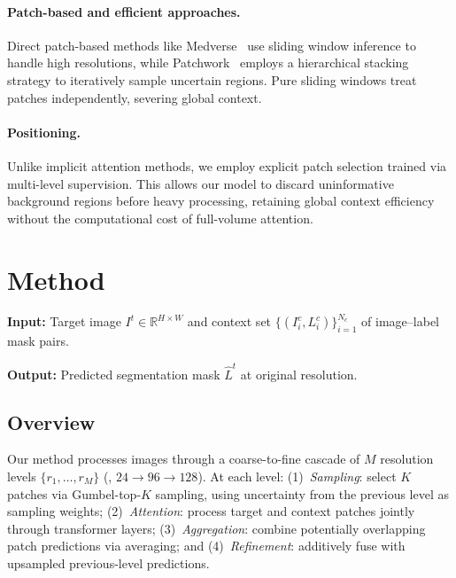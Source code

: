 \documentclass[10pt,twocolumn,letterpaper]{article}
\begin{document}
\paragraph{Patch-based and efficient approaches.}
Direct patch-based methods like Medverse~\cite{huMedverseUniversalModel2025a} use sliding window inference to handle high resolutions, while Patchwork~\cite{reisertDeepNeuralPatchworks2022a} employs a hierarchical stacking strategy to iteratively sample uncertain regions. Pure sliding windows treat patches independently, severing global context.

\paragraph{Positioning.}
Unlike implicit attention methods, we employ explicit patch selection trained via multi-level supervision. This allows our model to discard uninformative background regions before heavy processing, retaining global context efficiency without the computational cost of full-volume attention.

\section{Method}
\label{sec:method}

\noindent \textbf{Input:} Target image $I^t \in \mathbb{R}^{H \times W}$ and context set $\{(I^c_i, L^c_i)\}_{i=1}^{N_c}$ of image--label mask pairs.

\noindent \textbf{Output:} Predicted segmentation mask $\hat{L}^t$ at original resolution.

\subsection{Overview}
\label{sec:overview}

Our method processes images through a coarse-to-fine cascade of $M$ resolution levels $\{r_1, \ldots, r_M\}$ (\eg, $24 \rightarrow 96 \rightarrow 128$). At each level: (1)~\textit{Sampling}: select $K$ patches via Gumbel-top-$K$ sampling, using uncertainty from the previous level as sampling weights; (2)~\textit{Attention}: process target and context patches jointly through transformer layers; (3)~\textit{Aggregation}: combine potentially overlapping patch predictions via averaging; and (4)~\textit{Refinement}: additively fuse with upsampled previous-level predictions.
\end{document}
